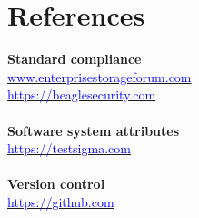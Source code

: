 \documentclass[11pt,twoside]{article}
\begin{document}
\newpage

\section{References}
\textbf{Standard compliance}\\
\href{https://www.enterprisestorageforum.com/management/7-essential-compliance-regulations-for-data-storage-systems/}{\textcolor{blue}{www.enterprisestorageforum.com}}\\
\href{https://beaglesecurity.com/blog/article/software-compliance-standards.html}{\textcolor{blue}{https://beaglesecurity.com}}\\
\\
\textbf{Software system attributes}\\
\href{https://testsigma.com/blog/software-quality-attributes/}{\textcolor{blue}{https://testsigma.com}}\\
\\
\textbf{Version control}\\
\href{https://github.com/resources/articles/software-development/what-is-version-control}{\textcolor{blue}{https://github.com}}
\end{document}
